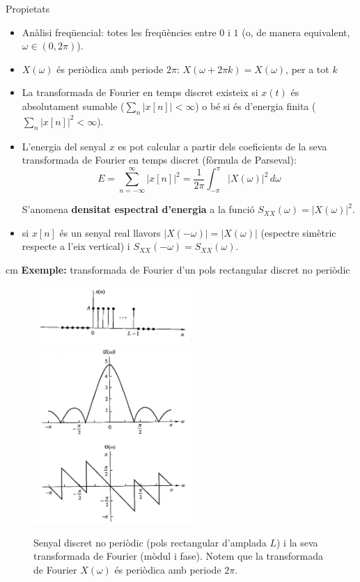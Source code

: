 \documentclass{article}
\begin{document}
\begin{description}
\noindent
Propietats
\begin{itemize}
\item An\`alisi freq\"uencial: totes les freq\"u\`encies entre $0$ i $1$ (o, de manera equivalent, $\omega \in (0, 2\pi)$).
\item $X(\omega)$ \'es peri\`odica amb periode $2\pi$: $X(\omega+2\pi k)=X(\omega)$, per a tot $k$
\item La transformada de Fourier en temps discret existeix si $x(t)$ \'es absolutament sumable ($\sum_n |x[n]| < \infty$)
o b\'e si \'es d'energia finita ($\sum_n |x[n]|^2 < \infty$).
\item L'energia del senyal $x$ es pot calcular a partir dels coeficients de la seva transformada de Fourier en temps discret
(f\`ormula de Parseval):
\[
E=\sum_{n=-\infty}^\infty |x[n]|^2 = \frac{1}{2\pi} \int_{-\pi}^\pi |X(\omega)|^2 \, d\omega
\]

S'anomena \textbf{densitat espectral d'energia} a la funci\'o $S_{XX}(\omega)=|X(\omega)|^2$.

\item si $x[n]$ \'es un senyal real llavors $|X(-\omega)|=|X(\omega)|$ (espectre sim\`etric respecte a l'eix vertical)
i $S_{XX}(-\omega)=S_{XX}(\omega)$.

\end{itemize}

 cm
\noindent
\textbf{Exemple:} transformada de Fourier d'un pols rectangular discret no peri\`odic

\begin{figure}[htbp]
\begin{center}
\includegraphics[width=6cm]{polsrectdiscret.png} 
$\qquad$
\includegraphics[width=6cm]{polsrectdiscretTF.png} 
\end{center}
\caption{Senyal discret no peri\`odic (pols rectangular d'amplada $L$) i la
seva transformada de Fourier (m\`odul i fase).
Notem que la transformada de Fourier $X(\omega)$ \'es peri\`odica amb periode $2\pi$.}
\end{figure}




\end{description}
\end{document}
